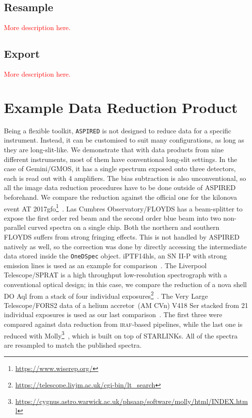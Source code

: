 \documentclass[twocolumn, linenumbers]{aastex631}
\begin{document}
\subsection{Resample}
{\Huge\textcolor{red}{More description here.}}

\subsection{Export}
{\Huge\textcolor{red}{More description here.}}

\section{Example Data Reduction Product}
\label{sec:comparison}
Being a flexible toolkit, \texttt{ASPIRED} is not designed to reduce data for a
specific instrument. Instead, it can be customised to suit many configurations,
as long as they are long-slit-like. We demonstrate that with data products
from nine different instruments, most of them have conventional long-slit settings.
In the case of Gemini/GMOS, it has a single spectrum exposed onto three detectors,
each is read out with 4 amplifiers. The bias subtraction is also unconventional,
so all the image data reduction procedures have to be done outside of ASPIRED
beforehand. We compare the reduction against the official one for the kilonova
event AT 2017gfo\footnote{\url{https://www.wiserep.org/}}~\citep{2017ApJ...848L..32M}. Las Cumbres
Observatory/FLOYDS has a beam-splitter to expose
the first order red beam and the second order blue beam into two non-parallel
curved spectra on a single chip. Both the northern and southern FLOYDS suffers
from strong fringing effects. This is not handled by ASPIRED natively as well,
so the correction was done by directly accessing the intermediate data stored
inside the \texttt{OneDSpec} object. iPTF14hls, an SN II-P with strong emission
lines is used as an example for comparison~\citep{2017Natur.551..210A}. The Liverpool Telescope/SPRAT is a
high throughput low-resolution spectrograph with a conventional optical design;
in this case, we compare the reduction of a nova shell DO Aql from a stack of
four individual exposures\footnote{\url{https://telescope.livjm.ac.uk/cgi-bin/lt_search}}~\citep{2020MNRAS.499.2959H}. The Very Large Telescope/FORS2 data of a helium
accretor~(AM CVn) V418 Ser stacked from 21 individual exposures is used as our
last comparison~\citep{2020MNRAS.496.1243G}. The first three were compared against data reduction from
\textsc{iraf}-based pipelines, while the last one is reduced with Molly\footnote{\url{https://cygnus.astro.warwick.ac.uk/phsaap/software/molly/html/INDEX.html}}~\citep{2019ascl.soft07012M}, which
is built on top of STARLINKs. All of the spectra are resampled to match the
published spectra.
\end{document}

